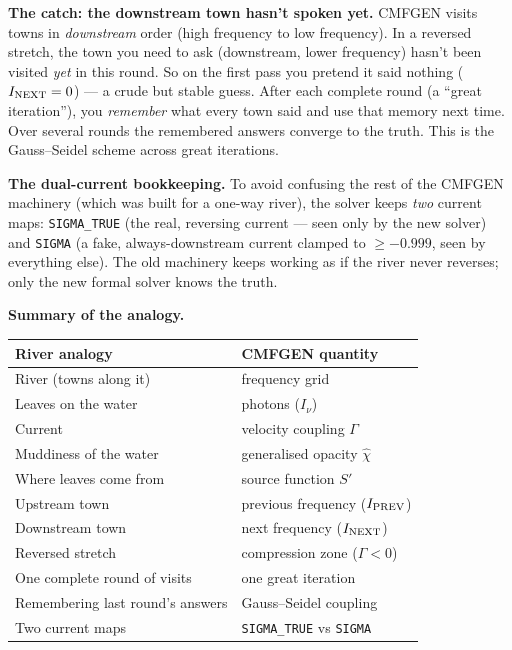 \documentclass[11pt]{article}
\begin{document}
\medskip\noindent
\textbf{The catch: the downstream town hasn't spoken yet.}\quad
CMFGEN visits towns in \emph{downstream} order (high frequency to low
frequency).  In a reversed stretch, the town you need to ask
(downstream, lower frequency) hasn't been visited \emph{yet} in this
round.  So on the first pass you pretend it said nothing
($I_{\rm NEXT} = 0$) --- a crude but stable guess.  After each complete
round (a ``great iteration''), you \emph{remember} what every town said
and use that memory next time.  Over several rounds the remembered
answers converge to the truth.  This is the Gauss--Seidel scheme across
great iterations.

\medskip\noindent
\textbf{The dual-current bookkeeping.}\quad
To avoid confusing the rest of the CMFGEN machinery (which was built for
a one-way river), the solver keeps \emph{two} current maps:
\texttt{SIGMA\_TRUE} (the real, reversing current --- seen only by the
new solver) and \texttt{SIGMA} (a fake, always-downstream current
clamped to $\ge -0.999$, seen by everything else).  The old machinery
keeps working as if the river never reverses; only the new formal
solver knows the truth.

\medskip\noindent
\textbf{Summary of the analogy.}\quad

\begin{center}
\begin{tabular}{ll}
\toprule
River analogy & CMFGEN quantity \\
\midrule
River (towns along it)        & frequency grid \\
Leaves on the water           & photons ($I_\nu$) \\
Current                       & velocity coupling $\Gamma$ \\
Muddiness of the water        & generalised opacity $\hat\chi$ \\
Where leaves come from        & source function $S'$ \\
Upstream town                 & previous frequency ($I_{\rm PREV}$) \\
Downstream town               & next frequency ($I_{\rm NEXT}$) \\
Reversed stretch              & compression zone ($\Gamma < 0$) \\
One complete round of visits  & one great iteration \\
Remembering last round's answers & Gauss--Seidel coupling \\
Two current maps              & \texttt{SIGMA\_TRUE} vs \texttt{SIGMA} \\
\bottomrule
\end{tabular}
\end{center}
\end{document}
